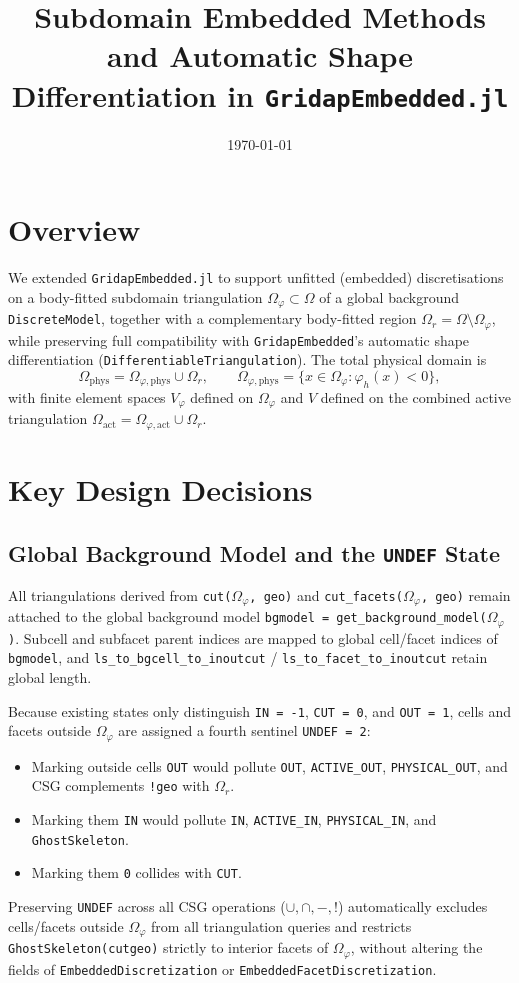 \documentclass[11pt,a4paper]{article}
\title{Subdomain Embedded Methods and Automatic Shape Differentiation in \texttt{GridapEmbedded.jl}}
\date{\today}
\author{}
\begin{document}
\maketitle

\section{Overview}
We extended \texttt{GridapEmbedded.jl} to support unfitted (embedded) discretisations on a body-fitted subdomain triangulation $\Omega_\varphi \subset \Omega$ of a global background \texttt{DiscreteModel}, together with a complementary body-fitted region $\Omega_r = \Omega \setminus \Omega_\varphi$, while preserving full compatibility with \texttt{GridapEmbedded}'s automatic shape differentiation (\texttt{DifferentiableTriangulation}). The total physical domain is
\[
  \Omega_{\mathrm{phys}} = \Omega_{\varphi,\mathrm{phys}} \cup \Omega_r,
  \qquad
  \Omega_{\varphi,\mathrm{phys}} = \{x \in \Omega_\varphi : \varphi_h(x) < 0\},
\]
with finite element spaces $V_\varphi$ defined on $\Omega_\varphi$ and $V$ defined on the combined active triangulation $\Omega_{\mathrm{act}} = \Omega_{\varphi,\mathrm{act}} \cup \Omega_r$.

\section{Key Design Decisions}

\subsection{Global Background Model and the \texttt{UNDEF} State}
All triangulations derived from \texttt{cut($\Omega_\varphi$, geo)} and \texttt{cut\_facets($\Omega_\varphi$, geo)} remain attached to the global background model \texttt{bgmodel = get\_background\_model($\Omega_\varphi$)}. Subcell and subfacet parent indices are mapped to global cell/facet indices of \texttt{bgmodel}, and \texttt{ls\_to\_bgcell\_to\_inoutcut} / \texttt{ls\_to\_facet\_to\_inoutcut} retain global length.

Because existing states only distinguish \texttt{IN = -1}, \texttt{CUT = 0}, and \texttt{OUT = 1}, cells and facets outside $\Omega_\varphi$ are assigned a fourth sentinel \texttt{UNDEF = 2}:
\begin{itemize}
  \item Marking outside cells \texttt{OUT} would pollute \texttt{OUT}, \texttt{ACTIVE\_OUT}, \texttt{PHYSICAL\_OUT}, and CSG complements \texttt{!geo} with $\Omega_r$.
  \item Marking them \texttt{IN} would pollute \texttt{IN}, \texttt{ACTIVE\_IN}, \texttt{PHYSICAL\_IN}, and \texttt{GhostSkeleton}.
  \item Marking them \texttt{0} collides with \texttt{CUT}.
\end{itemize}
Preserving \texttt{UNDEF} across all CSG operations ($\cup, \cap, -, !$) automatically excludes cells/facets outside $\Omega_\varphi$ from all triangulation queries and restricts \texttt{GhostSkeleton(cutgeo)} strictly to interior facets of $\Omega_\varphi$, without altering the fields of \texttt{EmbeddedDiscretization} or \texttt{EmbeddedFacetDiscretization}.
\end{document}
